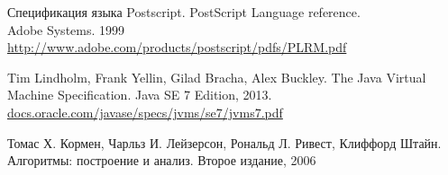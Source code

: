 \documentclass[14pt]{extarticle}
\begin{document}
	
	\pagebreak
	
	
	
	\begin{thebibliography}{}
		
		Спецификация языка Postscript. PostScript Language reference. \\
		Adobe Systems. 1999\\
		\url{http://www.adobe.com/products/postscript/pdfs/PLRM.pdf}
		
		Tim Lindholm, Frank Yellin, Gilad Bracha, Alex Buckley.
		The Java Virtual Machine Specification.
		Java SE 7 Edition, 2013. \\
		\url{docs.oracle.com/javase/specs/jvms/se7/jvms7.pdf}
		
		Томас Х. Кормен, Чарльз И. Лейзерсон, Рональд Л. Ривест, Клиффорд Штайн.
		Алгоритмы: построение и анализ.
		Второе издание, 2006
		
	\end{thebibliography}
\end{document}
